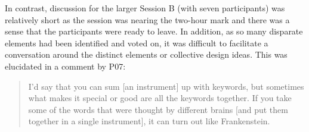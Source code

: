 \documentclass[letterpaper, 12pt]{article}
\begin{document}
In contrast, discussion for the larger Session B (with seven participants) was relatively short as the session was nearing the two-hour mark and there was a sense that the participants were ready to leave. In addition, as so many disparate elements had been identified and voted on, it was difficult to facilitate a conversation around the distinct elements or collective design ideas. This was elucidated in a comment by P07:  

\begin{quote}
   I'd say that you can sum [an instrument] up with keywords, but sometimes what makes it special or good are all the keywords together. If you take some of the words that were thought by different brains [and put them together in a single instrument], it can turn out like Frankenstein.
\end{quote}



\end{document}
